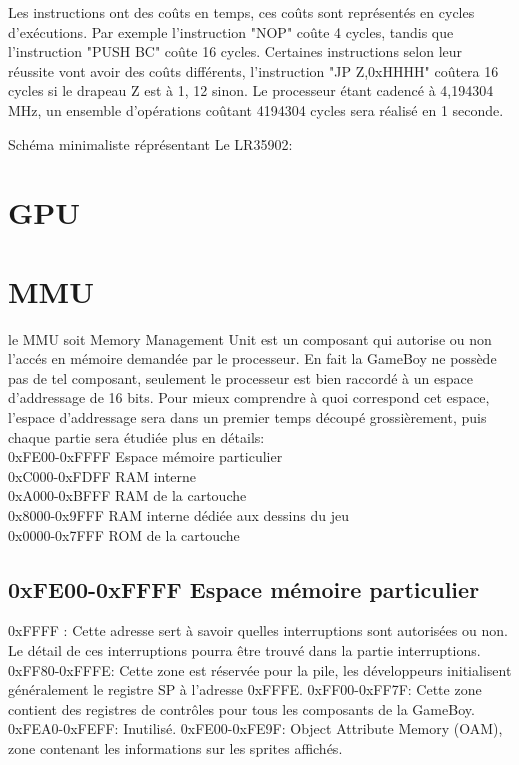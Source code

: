 \documentclass{report}
\begin{document}
Les instructions ont des coûts en temps, ces coûts sont représentés en cycles d'exécutions.
Par exemple l'instruction "NOP" coûte 4 cycles, tandis que l'instruction "PUSH BC" coûte 16 cycles.
Certaines instructions selon leur réussite vont avoir des coûts différents, l'instruction "JP Z,0xHHHH" coûtera 16 cycles si le drapeau Z est à 1, 12 sinon.
Le processeur étant cadencé à 4,194304 MHz, un ensemble d'opérations coûtant 4194304 cycles sera réalisé en 1 seconde.

Schéma minimaliste réprésentant Le LR35902:

\section{GPU}
\section{MMU}
le MMU soit Memory Management Unit est un composant qui autorise ou non l'accés en mémoire demandée par le processeur.
En fait la GameBoy ne possède pas de tel composant, seulement le processeur est bien raccordé à un espace d'addressage de 16 bits.
Pour mieux comprendre à quoi correspond cet espace, l'espace d'addressage sera
dans un premier temps découpé grossièrement, puis chaque partie sera étudiée
plus en détails:\\
0xFE00-0xFFFF Espace mémoire particulier\\
0xC000-0xFDFF RAM interne\\
0xA000-0xBFFF RAM de la cartouche\\
0x8000-0x9FFF RAM interne dédiée aux dessins du jeu\\
0x0000-0x7FFF ROM de la cartouche\\

\subsection{0xFE00-0xFFFF Espace mémoire particulier}

0xFFFF : Cette adresse sert à savoir quelles interruptions sont autorisées ou
non. Le détail de ces interruptions pourra être trouvé dans la partie
interruptions.
0xFF80-0xFFFE: Cette zone est réservée pour la pile, les
développeurs initialisent généralement le registre SP à l'adresse 0xFFFE.
0xFF00-0xFF7F: Cette zone contient des registres de contrôles pour tous les composants de la
GameBoy.
0xFEA0-0xFEFF: Inutilisé.
0xFE00-0xFE9F: Object Attribute Memory (OAM), zone contenant les informations
sur les sprites affichés.
\end{document}
